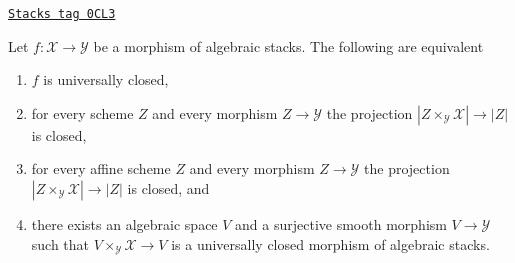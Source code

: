 \begin{lemma}
\label{stacks-morphisms-lemma-universally-closed-local}
\href{https://stacks.math.columbia.edu/tag/0CL3}{\texttt{Stacks tag 0CL3}}

Let $f : \mathcal{X} \to \mathcal{Y}$ be a morphism of algebraic stacks.
The following are equivalent
\begin{enumerate}
\item $f$ is universally closed,
\item for every scheme $Z$ and every morphism $Z \to \mathcal{Y}$
the projection $|Z \times_\mathcal{Y} \mathcal{X}| \to |Z|$
is closed,
\item for every affine scheme $Z$ and every morphism $Z \to \mathcal{Y}$
the projection $|Z \times_\mathcal{Y} \mathcal{X}| \to |Z|$ is
closed, and
\item there exists an algebraic space $V$ and a surjective smooth morphism
$V \to \mathcal{Y}$ such that $V \times_\mathcal{Y} \mathcal{X} \to V$
is a universally closed morphism of algebraic stacks.
\end{enumerate}
\end{lemma}

